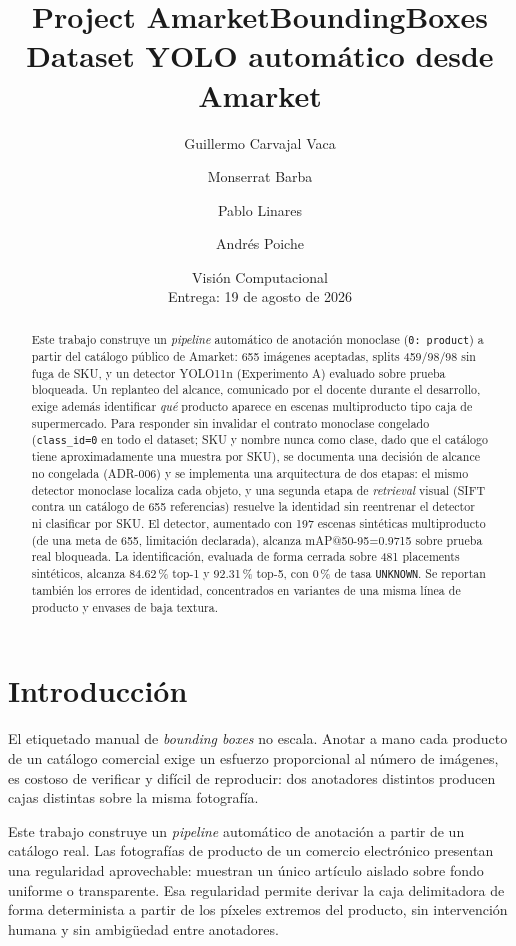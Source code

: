 \documentclass[10pt,a4paper]{article}
\title{Project AmarketBoundingBoxes \\
       \large Dataset YOLO automático desde Amarket}
\author{
  Guillermo Carvajal Vaca \and
  Monserrat Barba \and
  Pablo Linares \and
  Andrés Poiche
}
\date{Visión Computacional \\ Entrega: 19 de agosto de 2026}
\begin{document}
\maketitle

\begin{abstract}
Este trabajo construye un \emph{pipeline} automático de anotación monoclase
(\texttt{0: product}) a partir del catálogo público de Amarket: 655 imágenes
aceptadas, splits 459/98/98 sin fuga de SKU, y un detector YOLO11n
(Experimento A) evaluado sobre prueba bloqueada. Un replanteo del alcance,
comunicado por el docente durante el desarrollo, exige además identificar
\emph{qué} producto aparece en escenas multiproducto tipo caja de
supermercado. Para responder sin invalidar el contrato monoclase congelado
(\texttt{class\_id=0} en todo el dataset; SKU y nombre nunca como clase, dado
que el catálogo tiene aproximadamente una muestra por SKU), se documenta una
decisión de alcance no congelada (ADR-006) y se implementa una arquitectura
de dos etapas: el mismo detector monoclase localiza cada objeto, y una
segunda etapa de \emph{retrieval} visual (SIFT contra un catálogo de 655
referencias) resuelve la identidad sin reentrenar el detector ni clasificar
por SKU. El detector, aumentado con 197 escenas sintéticas multiproducto
(de una meta de 655, limitación declarada), alcanza mAP@50-95=0.9715 sobre
prueba real bloqueada. La identificación, evaluada de forma cerrada sobre
481 placements sintéticos, alcanza 84.62\,\% top-1 y 92.31\,\% top-5, con
0\,\% de tasa \texttt{UNKNOWN}. Se reportan también los errores de identidad,
concentrados en variantes de una misma línea de producto y envases de baja
textura.
\end{abstract}

\section{Introducción}

El etiquetado manual de \emph{bounding boxes} no escala. Anotar a mano cada
producto de un catálogo comercial exige un esfuerzo proporcional al número de
imágenes, es costoso de verificar y difícil de reproducir: dos anotadores
distintos producen cajas distintas sobre la misma fotografía.

Este trabajo construye un \emph{pipeline} automático de anotación a partir de un
catálogo real. Las fotografías de producto de un comercio electrónico presentan
una regularidad aprovechable: muestran un único artículo aislado sobre fondo
uniforme o transparente. Esa regularidad permite derivar la caja delimitadora de
forma determinista a partir de los píxeles extremos del producto, sin
intervención humana y sin ambigüedad entre anotadores.
\end{document}
